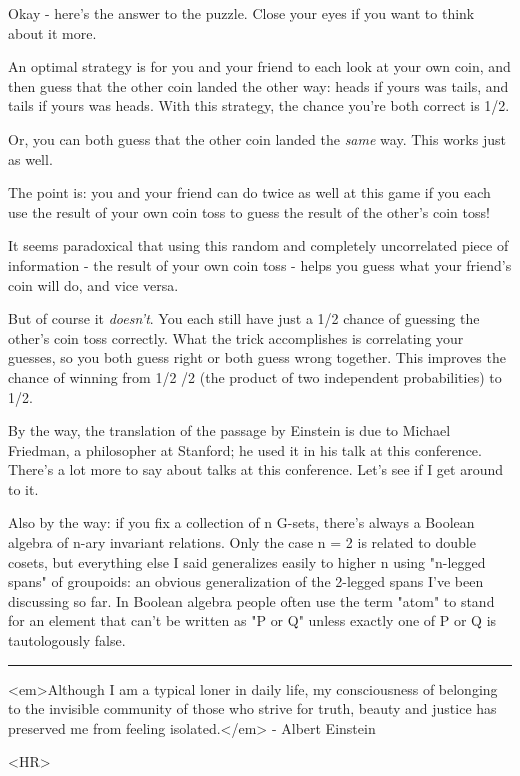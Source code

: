 Okay - here's the answer to the puzzle.  Close your eyes if you want
to think about it more.

An optimal strategy is for you and your friend to each look at your
own coin, and then guess that the other coin landed the other way:
heads if yours was tails, and tails if yours was heads.  With this
strategy, the chance you're both correct is 1/2.

Or, you can both guess that the other coin landed the \emph{same} way.
This works just as well.

The point is: you and your friend can do twice as well at this game if you each
use the result of your own coin toss to guess the result of the other's
coin toss! 

It seems paradoxical that using this random and completely uncorrelated 
piece of information - the result of your own coin toss - helps you 
guess what your friend's coin will do, and vice versa.

But of course it \emph{doesn't}.  You each still have just a 1/2 chance of
guessing the other's coin toss correctly.  What the trick accomplishes
is correlating your guesses, so you both guess right or both guess wrong 
together.  This improves the chance of winning from 1/2 /2 (the 
product of two independent probabilities) to 1/2.

By the way, the translation of the passage by Einstein is due to
Michael Friedman, a philosopher at Stanford; he used it in his talk
at this conference.  There's a lot more to say about talks at this 
conference.  Let's see if I get around to it.

Also by the way: if you fix a collection of n G-sets, there's always a
Boolean algebra of n-ary invariant relations.  Only the case n = 2 is
related to double cosets, but everything else I said generalizes
easily to higher n using "n-legged spans" of groupoids: an
obvious generalization of the 2-legged spans I've been discussing so
far.  In Boolean algebra people often use the term "atom" to
stand for an element that can't be written as "P or Q" unless exactly
one of P or Q is tautologously false.


\par\noindent\rule{\textwidth}{0.4pt}
<em>Although I am a typical loner in daily life, my consciousness
of belonging to the invisible community of those who strive for
truth, beauty and justice has preserved me from feeling isolated.</em> -
Albert Einstein

<HR>



